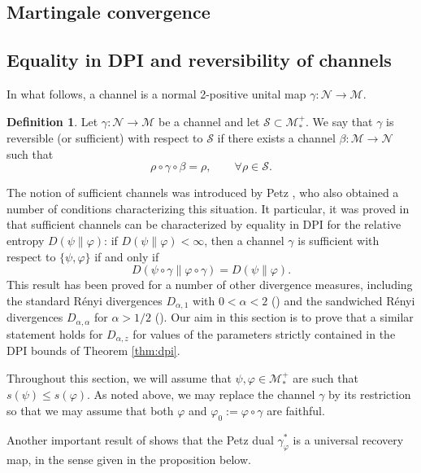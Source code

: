 \documentclass[12pt]{article}
\theoremstyle{definition}
\newtheorem{defi}[theorem]{Definition}
\theoremstyle{remark}
\def\Me{\mathcal M}
\def\Ne{\mathcal N}
\begin{document}
\subsection{Martingale convergence}




\subsection{Equality in DPI and reversibility of channels}

In what follows, a channel is a normal 2-positive unital map $\gamma: \Ne\to \Me$.

\begin{defi} Let $\gamma:\Ne\to \Me$ be a channel and let $\mathcal S \subset
\Me_*^+$. We say that $\gamma$ is reversible (or sufficient) with respect to $\mathcal S$
if there exists a channel $\beta:\Me\to \Ne$ such that
\[
\rho\circ\gamma\circ\beta=\rho,\qquad \forall \rho\in \mathcal S.
\]

\end{defi}

The notion of sufficient channels was introduced by Petz
\cite{petz1986sufficient,petz1988sufficiency}, who also obtained a number of conditions
characterizing this situation. It particular, it was proved in \cite{petz1988sufficiency}
that sufficient channels can be characterized by equality in DPI for the relative entropy
$D(\psi\|\varphi)$: if $D(\psi\|\varphi)<\infty$, then a channel $\gamma$ is sufficient
with respect to $\{\psi,\varphi\}$ if and only if 
\[
D(\psi\circ\gamma\|\varphi\circ\gamma)=D(\psi\|\varphi). 
\]
This result has been proved for a number of other divergence measures, including the
standard R\'enyi divergences $D_{\alpha,1}$ with $0<\alpha<2$ (\cite{}) and the sandwiched
R\'enyi divergences $D_{\alpha,\alpha}$ for $\alpha>1/2$
(\cite{jencova2018renyi,jencova2021renyi}).
Our aim in this section is to prove that a similar statement holds for $D_{\alpha,z}$ for
values of the parameters strictly contained in the DPI bounds of Theorem \ref{thm:dpi}. 

Throughout this section, we will assume that  $\psi,\varphi\in\Me_*^+$ are such that
$s(\psi)\le s(\varphi)$. As noted above, we may replace the channel $\gamma$ by its
restriction so that we may assume that both $\varphi$ and $\varphi_0:=\varphi\circ\gamma$
are faithful. 

Another important result of \cite{petz1988sufficiency} shows that the Petz dual $\gamma_\varphi^*$ is a universal
recovery map, in the sense given in the proposition below. 
\end{document}
